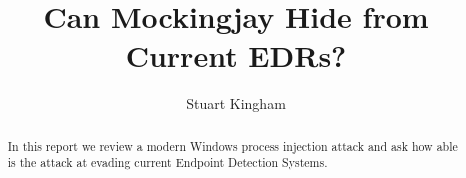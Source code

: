 \documentclass{article}
\title{Can Mockingjay Hide from Current EDRs?}
\author{Stuart Kingham}
\begin{document}
\maketitle

\begin{abstract}
  In this report we review a modern Windows process injection attack and ask how
  able is the attack at evading current Endpoint Detection Systems.
\end{abstract}

\tableofcontents





\pagebreak





\printbibliography

\appendix


\end{document}
